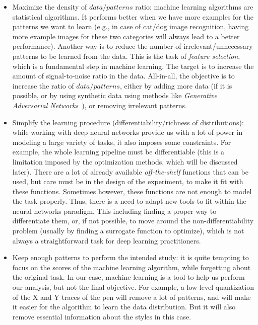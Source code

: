   \begin{itemize}
      \item Maximize the density of $data/patterns$ ratio: machine learning algorithms are statistical algorithms. It performs better when we have more examples for the patterns we want to learn (e.g., in case of cat/dog image recognition, having more example images for these two categories will always lead to a better performance).
      Another way is to reduce the number of irrelevant/unnecessary patterns to be learned from the data. This is the task of \textit{feature selection}, which is a fundamental step in machine learning. The target is to increase the amount of signal-to-noise ratio in the data.
      All-in-all, the objective is to increase the ratio of $data/patterns$, either by adding more data (if it is possible, or by using synthetic data using methods like \textit{Generative Adversarial Networks}~\citep{goodfellow2014generative}), or removing irrelevant patterns.

      \item Simplify the learning procedure (differentiability/richness of distributions): while working with deep neural networks provide us with a lot of power in modeling a large variety of tasks, it also imposes some constraints.
      For example, the whole learning pipeline must be differentiable (this is a limitation imposed by the optimization methods, which will be discussed later). There are a lot of already available \textit{off-the-shelf} functions that can be used, but care must be in the design of the experiment, to make it fit with these functions.
      Sometimes however, these functions are not enough to model the task properly. Thus, there is a need to adapt new tools to fit within the neural networks paradigm. This including finding a proper way to differentiate them, or, if not possible, to move around the non-differentiability problem (usually by finding a surrogate function to optimize), which is not always a straightforward task for deep learning practitioners.

      \item Keep enough patterns to perform the intended study: it is quite tempting to focus on the scores of the machine learning algorithm, while forgetting about the original task. In our case, machine learning is a tool to help us perform our analysis, but not the final objective. For example, a low-level quantization of the X and Y traces of the pen will remove a lot of patterns, and will make it easier for the algorithm to learn the data distribution. But it will also remove essential information about the styles in this case.
  \end{itemize}

